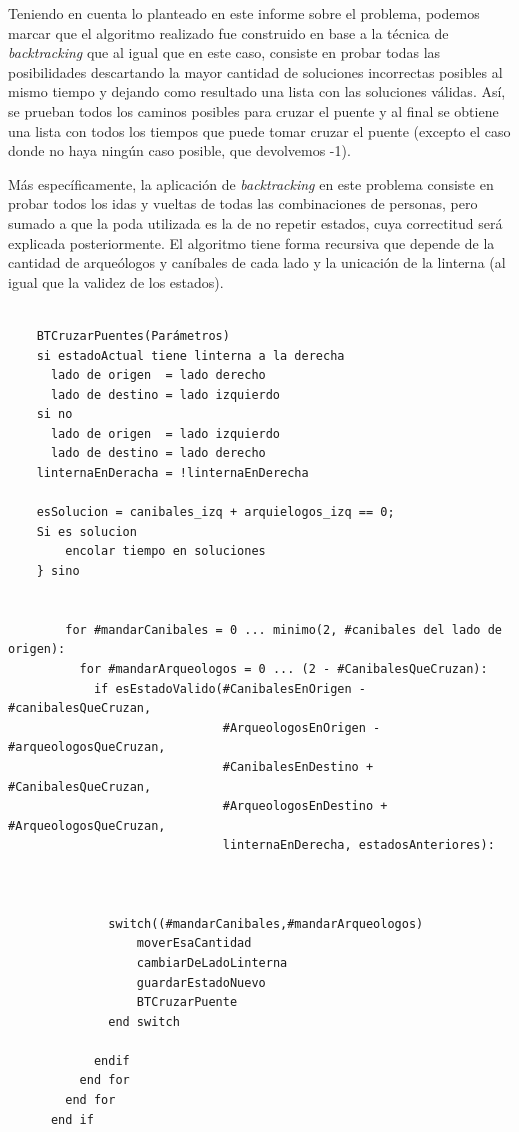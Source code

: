         Teniendo en cuenta lo planteado en este informe sobre el problema, podemos marcar que el algoritmo realizado fue construido en base a la técnica de \emph{backtracking} que al igual que en este caso, consiste en probar todas las posibilidades descartando la mayor cantidad de soluciones incorrectas posibles al mismo tiempo y dejando como resultado una lista con las soluciones válidas. Así, se prueban todos los caminos posibles para cruzar el puente y al final se obtiene una lista con todos los tiempos que puede tomar cruzar el puente (excepto el caso donde no haya ningún caso posible, que devolvemos -1).

        Más específicamente, la aplicación de \emph{backtracking} en este problema consiste en probar todos los idas y vueltas de todas las combinaciones de personas, pero sumado a que la poda utilizada es la de no repetir estados, cuya correctitud será explicada posteriormente. El algoritmo tiene forma recursiva que depende de la cantidad de arqueólogos y caníbales de cada lado y la unicación de la linterna (al igual que la validez de los estados).


    \begin{codesnippet}
    \begin{verbatim}

    BTCruzarPuentes(Parámetros)
    si estadoActual tiene linterna a la derecha
      lado de origen  = lado derecho
      lado de destino = lado izquierdo
    si no
      lado de origen  = lado izquierdo
      lado de destino = lado derecho
    linternaEnDeracha = !linternaEnDerecha
    
    esSolucion = canibales_izq + arquielogos_izq == 0;
    Si es solucion
        encolar tiempo en soluciones
    } sino    


        for #mandarCanibales = 0 ... minimo(2, #canibales del lado de origen):
          for #mandarArqueologos = 0 ... (2 - #CanibalesQueCruzan):
            if esEstadoValido(#CanibalesEnOrigen - #canibalesQueCruzan,
                              #ArqueologosEnOrigen - #arqueologosQueCruzan,
                              #CanibalesEnDestino + #CanibalesQueCruzan,
                              #ArqueologosEnDestino + #ArqueologosQueCruzan,
                              linternaEnDerecha, estadosAnteriores):
              

              
              switch((#mandarCanibales,#mandarArqueologos)
                  moverEsaCantidad
                  cambiarDeLadoLinterna
                  guardarEstadoNuevo
                  BTCruzarPuente
              end switch

            endif  
          end for
        end for
      end if
    \end{verbatim}
    \end{codesnippet}

